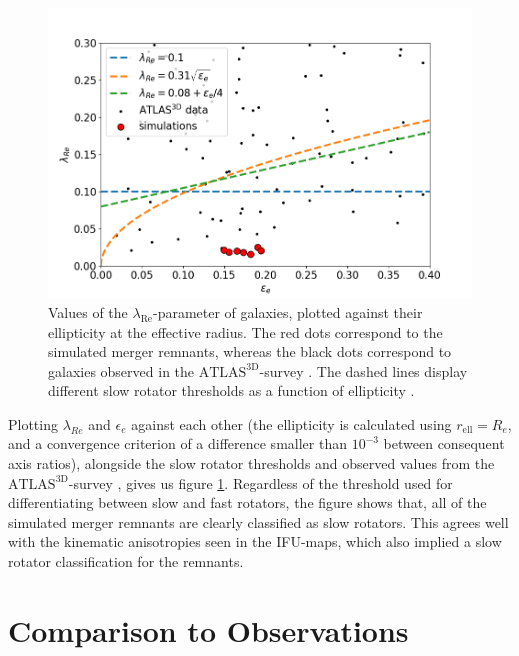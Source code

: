 \documentclass[english, twoside]{HYgradu}
\begin{document}
\begin{figure}
	\centering
	\includegraphics[width=\textwidth]{lambda_epsilon.png}
	\caption{Values of the $\lambda_{\mathrm{Re}}$-parameter of galaxies, plotted against their ellipticity at the effective radius. The red dots correspond to the simulated merger remnants, whereas the black dots correspond to galaxies observed in the $\mathrm{ATLAS^{3D}}$-survey \citep{Cappellari2011, Emsellem2011}. The dashed lines display different slow rotator thresholds as a function of ellipticity \citep{Emsellem2007, Emsellem2011, Cappellari2016}.}
	\label{figure:lambda_epsilon}
\end{figure}

Plotting $\lambda_{Re}$ and $\epsilon_e$ against each other (the ellipticity is calculated using $r_\mathrm{ell} = R_e$, and a convergence criterion of a difference smaller than $10^{-3}$ between consequent axis ratios), alongside the slow rotator thresholds and observed values from the $\mathrm{ATLAS^{3D}}$-survey \citep{Cappellari2011}, gives us figure \ref{figure:lambda_epsilon}. Regardless of the threshold used for differentiating between slow and fast rotators, the figure shows that, all of the simulated merger remnants are clearly classified as slow rotators. This agrees well with the kinematic anisotropies seen in the IFU-maps, which also implied a slow rotator classification for the remnants.

\section{Comparison to Observations}
\end{document}

